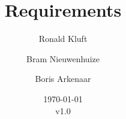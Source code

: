 \documentclass{article}
\begin{document}
\title{Requirements}
\author{Ronald Kluft \and Bram Nieuwenhuize \and Boris Arkenaar}
\date{\today\\v1.0}
\maketitle


\end{document}
